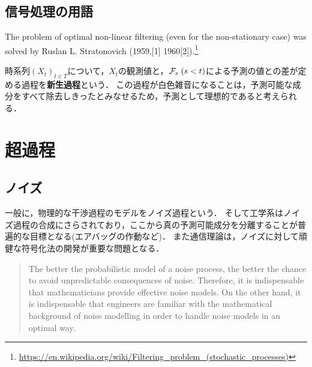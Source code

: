 \documentclass[uplatex,dvipdfmx]{jsreport}
\begin{document}
\section{信号処理の用語}

\begin{tcolorbox}[colframe=ForestGreen, colback=ForestGreen!10!white,breakable,colbacktitle=ForestGreen!40!white,coltitle=black,fonttitle=\bfseries\sffamily,
title=]
The problem of optimal non-linear filtering (even for the non-stationary case) was solved by Ruslan L. Stratonovich (1959,[1] 1960[2]).\footnote{\url{https://en.wikipedia.org/wiki/Filtering_problem_(stochastic_processes)}}
\end{tcolorbox}

\begin{definition}
    
\end{definition}

\begin{definition}[innovation]
    時系列$(X_t)_{t\in T}$について，$X_t$の観測値と，$\mathcal{F}_s\;(s<t)$による予測の値との差が定める過程を\textbf{新生過程}という．
    この過程が白色雑音になることは，予測可能な成分をすべて除去しきったとみなせるため，予測として理想的であると考えられる．
\end{definition}

\chapter{超過程}

\section{ノイズ}

一般に，物理的な干渉過程のモデルをノイズ過程という．
そして工学系はノイズ過程の合成にさらされており，ここから真の予測可能成分を分離することが普遍的な目標となる(エアバッグの作動など)．
また通信理論は，ノイズに対して頑健な符号化法の開発が重要な問題となる．
\begin{quote}
    The
better the probabilistic model of a noise process, the better the chance to
avoid unpredictable consequences of noise. Therefore, it is indispensable
that mathematicians provide effective noise models. On the other hand, it is
indispensable that engineers are familiar with the mathematical background
of noise modelling in order to handle noise models in an optimal way.\cite{Schaffler}
\end{quote}
\end{document}
